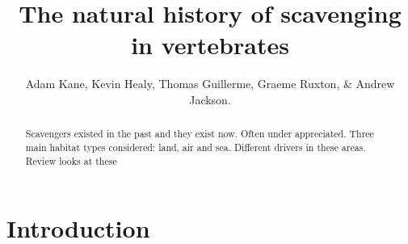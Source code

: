 \documentclass[a4paper,12pt]{article}
\title{The natural history of scavenging in vertebrates}
\author{Adam Kane, Kevin Healy, Thomas Guillerme, Graeme Ruxton, \& Andrew Jackson.}
\begin{document}
\maketitle


\begin{abstract}
 Scavengers existed in the past and they exist now. 
 Often under appreciated. 
 Three main habitat types considered: land, air and sea. 
 Different drivers in these areas. 
 Review looks at these 
\end{abstract}


\newpage


\section*{Introduction}
\end{document}
